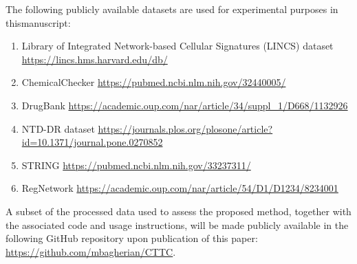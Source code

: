 \documentclass{article}
\begin{document}
The following publicly available datasets are used for experimental purposes in thismanuscript: 
\begin{enumerate}[label=(\roman*)]
	\item Library of Integrated Network-based Cellular Signatures (LINCS) dataset {\url{https://lincs.hms.harvard.edu/db/}} 
	\item ChemicalChecker \url{https://pubmed.ncbi.nlm.nih.gov/32440005/} \cite{duran2020extending}
	\item DrugBank \url{https://academic.oup.com/nar/article/34/suppl_1/D668/1132926} \cite{wishart2006drugbank}
	\item  NTD-DR dataset  \url{https://journals.plos.org/plosone/article?id=10.1371/journal.pone.0270852} \cite{jamali2022ntd}
	\item STRING \url{https://pubmed.ncbi.nlm.nih.gov/33237311/}  \cite{szklarczyk2021string}
	\item  RegNetwork \url{https://academic.oup.com/nar/article/54/D1/D1234/8234001} \cite{liu2015regnetwork}
	
\end{enumerate}

\noindent A subset of the processed data used to assess the proposed method, together with the associated code and usage instructions, will be made publicly available in the following GitHub repository upon publication of this paper: \href{https://github.com/mbagherian/CTTC}{https://github.com/mbagherian/CTTC}.









% 
 
%

\end{document}
